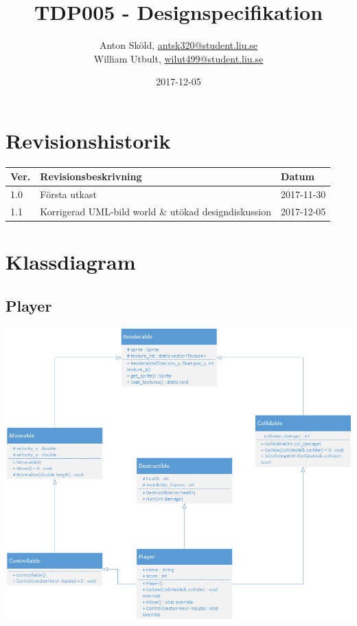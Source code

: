 \documentclass{TDP005mall}
\author{Anton Sköld, \url{antsk320@student.liu.se}\\
  William Utbult, \url{wilut499@student.liu.se}}
\title{TDP005 - Designspecifikation}
\date{2017-12-05}
\begin{document}
\projectpage
\section{Revisionshistorik}
\begin{table}[!h]
\begin{tabularx}{\linewidth}{|l|X|l|}
\hline
Ver. & Revisionsbeskrivning & Datum \\\hline
	1.0 & Första utkast & 2017-11-30 \\\hline
    1.1 & Korrigerad UML-bild world \& utökad designdiskussion & 2017-12-05 \\\hline
\end{tabularx}
\end{table}

\tableofcontents

\clearpage
\section{Klassdiagram}

\subsection{Player}
\begin{center}
\includegraphics[scale=0.75]{Drawings/player.png}
\end{center}
\clearpage
\end{document}
